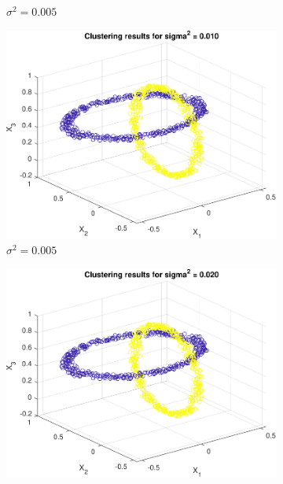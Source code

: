 \documentclass{article}
\begin{document}
\begin{figure}[h]
\begin{subfigure}[b]{0.3\textwidth}
                 \caption{$\sigma^2 = 0.005$}
                 \label{fig:spectral_2}
             \end{subfigure}
            \hfill
             \begin{subfigure}[b]{0.3\textwidth}
                 \includegraphics[width=\textwidth]{Assignment 3/figures/1_2/spectral_rings_sig2_0.010.pdf}
                 \caption{$\sigma^2 = 0.005$}
                 \label{fig:spectral_3}
             \end{subfigure}
                         \hfill
             \begin{subfigure}[b]{0.3\textwidth}
                 \includegraphics[width=\textwidth]{Assignment 3/figures/1_2/spectral_rings_sig2_0.020.pdf}

\end{subfigure}
\end{figure}
\end{document}
